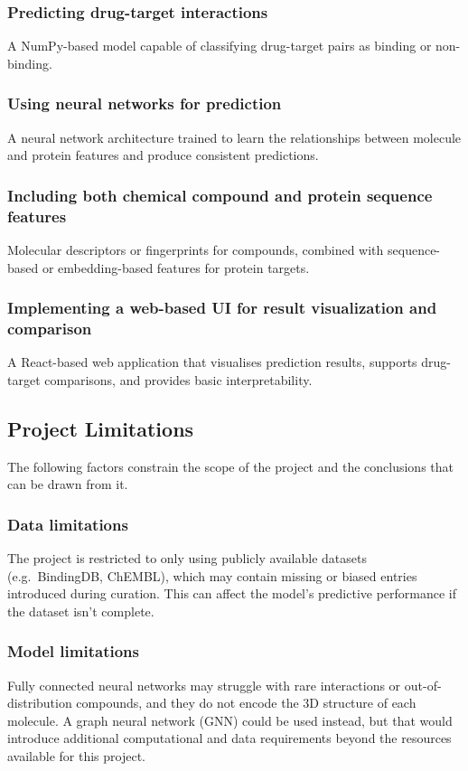 \subsubsection{Predicting drug-target interactions}
A NumPy-based model capable of classifying drug-target pairs as binding or non-binding.
\subsubsection{Using neural networks for prediction}
A neural network architecture trained to learn the relationships between molecule and protein features and produce consistent predictions.
\subsubsection{Including both chemical compound and protein sequence features}
Molecular descriptors or fingerprints for compounds, combined with sequence-based or embedding-based features for protein targets.
\subsubsection{Implementing a web-based UI for result visualization and comparison}
A React-based web application that visualises prediction results, supports drug-target comparisons, and provides basic interpretability.

\subsection{Project Limitations}
The following factors constrain the scope of the project and the conclusions that can be drawn from it.
\subsubsection{Data limitations}
The project is restricted to only using publicly available datasets (e.g.\ BindingDB, ChEMBL), which may contain missing or biased entries introduced during curation.
This can affect the model's predictive performance if the dataset isn't complete.
\subsubsection{Model limitations}
Fully connected neural networks may struggle with rare interactions or out-of-distribution compounds, and they do not encode the 3D structure of each molecule.
A graph neural network (GNN) could be used instead, but that would introduce additional computational and data requirements beyond the resources available for this project.

